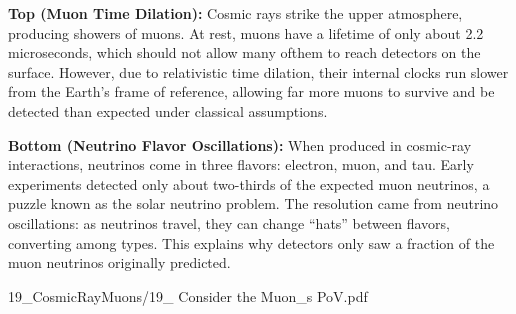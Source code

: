\begin{SideNotePage}{

    \textbf{Top (Muon Time Dilation):} Cosmic rays strike the upper atmosphere, producing showers of muons. At rest, muons have a lifetime of only about 2.2 microseconds, which should not allow many ofthem to reach detectors on the surface. However, due to relativistic time dilation, their internal clocks run slower from the Earth’s frame of reference, allowing far more muons to survive and be detected than expected under classical assumptions. \par
    \textbf{Bottom (Neutrino Flavor Oscillations):} When produced in cosmic-ray interactions, neutrinos come in three flavors: electron, muon, and tau. Early experiments detected only about two-thirds of the expected muon neutrinos, a puzzle known as the solar neutrino problem. The resolution came from neutrino oscillations: as neutrinos travel, they can change “hats” between flavors, converting among types. This explains why detectors only saw a fraction of the muon neutrinos originally predicted. \par

}{19_CosmicRayMuons/19_ Consider the Muon_s PoV.pdf}
\end{SideNotePage}
